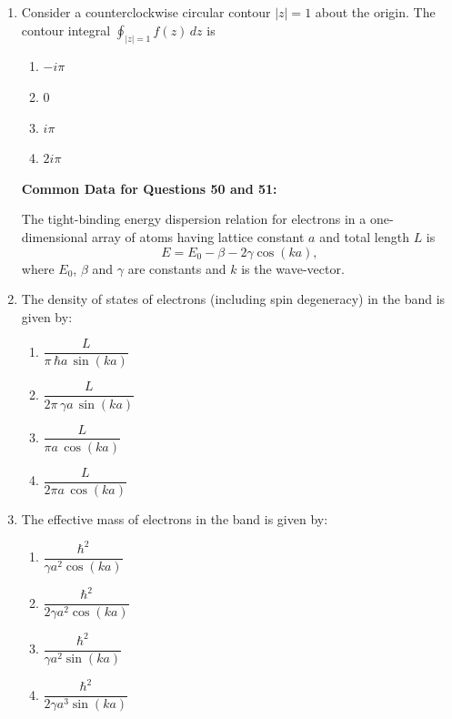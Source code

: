\documentclass[journal,12pt,onecolumn]{IEEEtran}
\begin{document}
\begin{enumerate}
\item Consider a counterclockwise circular contour $|z|=1$ about the origin. The contour integral $\displaystyle\oint_{|z|=1} f(z)\,dz$ is

\hfill{}

\begin{multicols}{4}
\begin{enumerate}
    \item $-i\pi$
    \item $0$
    \item $i\pi$
    \item $2i\pi$
\end{enumerate}
\end{multicols}


\textbf{Common Data for Questions 50 and 51:} \\

\vspace{2em}

The tight-binding energy dispersion relation for electrons in a one-dimensional array of atoms having lattice constant $a$ and total length $L$ is
\[
E = E_{0} - \beta - 2\gamma \cos(ka),
\]
where $E_{0}$, $\beta$ and $\gamma$ are constants and $k$ is the wave-vector. 

\item The density of states of electrons (including spin degeneracy) in the band is given by:

\hfill{}

\begin{multicols}{2}
\begin{enumerate}
    \item $\dfrac{L}{\pi\, \hbar a \,\sin(ka)}$
    \item $\dfrac{L}{2\pi\, \gamma a \,\sin(ka)}$
    \item $\dfrac{L}{\pi a \,\cos(ka)}$
    \item $\dfrac{L}{2\pi a \,\cos(ka)}$
\end{enumerate}
\end{multicols}

\item The effective mass of electrons in the band is given by:

\hfill{}

\begin{multicols}{2}
\begin{enumerate}
    \item $\dfrac{\hbar^{2}}{\gamma a^{2}\cos(ka)}$
    \item $\dfrac{\hbar^{2}}{2\gamma a^{2}\cos(ka)}$
    \item $\dfrac{\hbar^{2}}{\gamma a^{2}\sin(ka)}$
    \item $\dfrac{\hbar^{2}}{2\gamma a^{3}\sin(ka)}$
\end{enumerate}
\end{multicols}


\end{enumerate}
\end{document}
